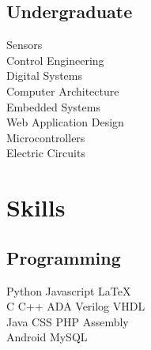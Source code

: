 \documentclass[]{deedy-resume-openfont}
\begin{document}
\begin{minipage}[t]{0.34\textwidth}
\subsection{Undergraduate}
Sensors \\
Control Engineering \\
Digital Systems \\
Computer Architecture \\
Embedded Systems \\
Web Application Design \\
Microcontrollers \\
Electric Circuits \\


\section{Skills}
\subsection{Programming}
Python \textbullet{} Javascript \textbullet{} \LaTeX\ \\
C \textbullet{} C++ \textbullet{} ADA \textbullet{} Verilog \textbullet{} VHDL \\
Java \textbullet{} CSS \textbullet{} PHP \textbullet{} Assembly \\
Android \textbullet{} MySQL
\sectionsep

%
%

\end{minipage} 
\hfill
\end{document}
